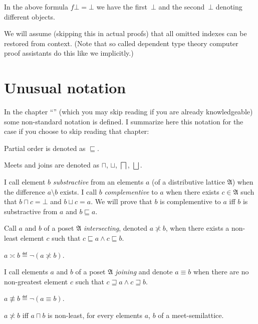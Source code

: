 \begin{note}
In the above formula $f\bot = \bot$ we have the first~$\bot$ and the second~$\bot$ denoting different objects.
\end{note}

We will assume (skipping this in actual proofs) that all omitted indexes can be restored from context.
(Note that so called dependent type theory computer proof assistants do this like we implicitly.)
\section{Unusual notation}

In the chapter ``'' (which you may skip reading
if you are already knowledgeable) some non-standard notation is defined.
I summarize here this notation for the case if you choose to skip
reading that chapter:

Partial order is denoted as $\sqsubseteq$.

Meets and joins are denoted as $\sqcap$, $\sqcup$, $\bigsqcap$,
$\bigsqcup$.

I call element $b$ \emph{substractive} from an elements $a$ (of a distributive
lattice $\mathfrak{A}$) when the difference $a\setminus b$ exists.
I call $b$ \emph{complementive} to $a$ when there exists $c\in\mathfrak{A}$
such that $b\sqcap c=\bot$ and $b\sqcup c=a$. We will prove that
$b$ is complementive to $a$ iff $b$ is substractive from $a$ and
$b\sqsubseteq a$.
\begin{defn}
Call $a$ and $b$ of a poset $\mathfrak{A}$ \emph{intersecting},
denoted $a\nasymp b$, when there exists a non-least element $c$
such that $c\sqsubseteq a\land c\sqsubseteq b$.
\end{defn}

\begin{defn}
$a\asymp b\eqdef\lnot(a\nasymp b)$.
\end{defn}

\begin{defn}
I call elements $a$ and $b$ of a poset $\mathfrak{A}$ \emph{joining}
and denote $a\equiv b$ when there are no non-greatest element $c$
such that $c\sqsupseteq a\land c\sqsupseteq b$.
\end{defn}

\begin{defn}
$a\nequiv b\eqdef\lnot(a\equiv b)$.\end{defn}
\begin{obvious}
$a\nasymp b$ iff $a\sqcap b$ is non-least, for every elements $a$,
$b$ of a meet-semilattice.
\end{obvious}

